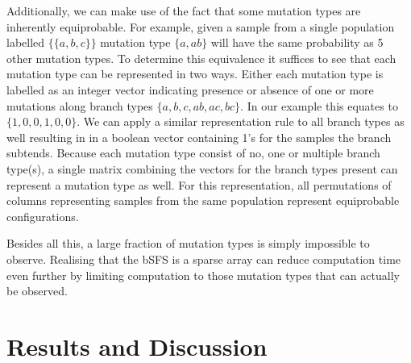 \documentclass[10pt, a4]{article}
\begin{document}
Additionally, we can make use of the fact that some mutation types are inherently equiprobable. For example, given a sample from a single population labelled $\{\{a, b, c\}\}$ mutation type $\{a, ab\}$ will have the same probability as 5 other mutation types. To determine this equivalence it suffices to see that each mutation type can be represented in two ways. Either each mutation type is labelled as an integer vector indicating presence or absence of one or more mutations along branch types $\{a, b, c, ab, ac, bc\}$. In our example this equates to $\{1, 0, 0,1, 0, 0\}$. We can apply a similar representation rule to all branch types as well resulting in in a boolean vector containing 1's for the samples the branch subtends. Because each mutation type consist of no, one or multiple branch type(s), a single matrix combining the vectors for the branch types present can represent a mutation type as well. For this representation, all permutations of columns representing samples from the same population represent equiprobable configurations.

Besides all this, a large fraction of mutation types is simply impossible to observe. Realising that the bSFS is a sparse array can reduce computation time even further by limiting computation to those mutation types that can actually be observed.

\section{Results and Discussion}
\end{document}
